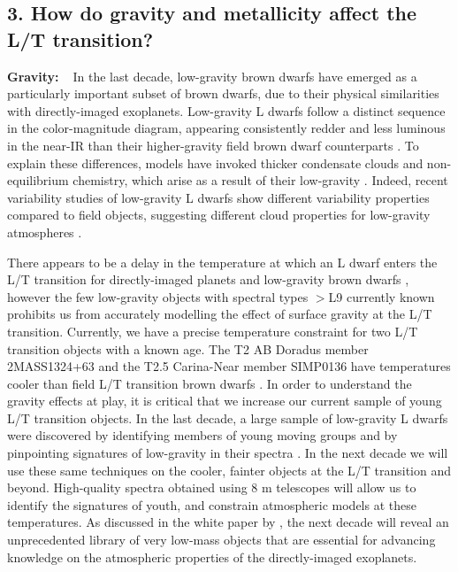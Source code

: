 \documentclass[12pt]{article}
\begin{document}
\begin{justify}
\subsection*{3. How do gravity and metallicity affect the L/T transition?}

\textbf{Gravity:~~}In the last decade, low-gravity brown dwarfs have emerged as a particularly important subset of brown dwarfs, due to their physical similarities with directly-imaged exoplanets. 
Low-gravity L dwarfs follow a distinct sequence in the color-magnitude diagram, appearing consistently redder and less luminous in the near-IR than their higher-gravity field brown dwarf counterparts \citep{Faherty2016}. To explain these differences, models have invoked thicker condensate clouds and non-equilibrium chemistry, which arise as a result of their low-gravity \citep{Marley2012}. Indeed, recent variability studies of low-gravity L dwarfs show different variability properties compared to field objects, suggesting different cloud properties for low-gravity atmospheres \citep{Biller2015, Vos2019}. \smallskip

\noindent There appears to be a delay in the temperature at which an L dwarf enters the L/T transition for directly-imaged planets and low-gravity brown dwarfs \citep{Metchev2006, Macintosh2015, Faherty2016}, however the few low-gravity objects with spectral types $>$L9 currently known prohibits us from accurately modelling the effect of surface gravity at the L/T transition. Currently, we have a precise temperature constraint for two L/T transition objects with a known age. The T2 AB Doradus member 2MASS1324+63 and the T2.5 Carina-Near member SIMP0136 have temperatures cooler than field L/T transition brown dwarfs \citep{Gagne2017, Gagne2018a}.
In order to understand the gravity effects at play, it is critical that we increase our current sample of young L/T transition objects. In the last decade, a large sample of low-gravity L dwarfs were discovered by identifying members of young moving groups and by pinpointing signatures of low-gravity in their spectra \citep{Cruz2009, Allers2013}. 
In the next decade we will use these same techniques on the cooler, fainter objects at the L/T transition and beyond. High-quality spectra obtained using $8$ m telescopes will allow us to identify the signatures of youth, and constrain atmospheric models at these temperatures. As discussed in the white paper by \citep{Faherty2019}, the next decade will reveal an unprecedented library of very low-mass objects that are essential for advancing knowledge on the atmospheric properties of the directly-imaged exoplanets. \smallskip


\end{justify}
\end{document}
